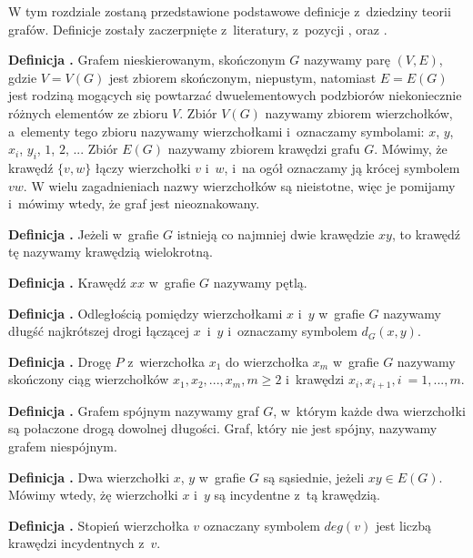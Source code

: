 W tym rozdziale zostaną przedstawione podstawowe definicje z~dziedziny teorii grafów.
Definicje zostały zaczerpnięte z~literatury, z~pozycji \cite{Wloch2008}, \cite{Wilson2012} oraz \cite{Wojciechwoski2013}.

\noindent
\textbf{Definicja .}
\incrementdefinitionIndex
Grafem nieskierowanym, skończonym $G$ nazywamy parę $(V,E)$, gdzie $V = V(G)$ jest zbiorem skończonym, niepustym,
natomiast $E = E(G)$ jest rodziną mogących się powtarzać dwuelementowych podzbiorów niekoniecznie różnych elementów ze zbioru $V$.
Zbiór $V(G)$ nazywamy zbiorem wierzchołków, a~elementy tego zbioru nazywamy wierzchołkami i~oznaczamy symbolami:
$x$, $y$, $x_i$, $y_i$, $1$, $2$, ... Zbiór $E(G)$ nazywamy zbiorem krawędzi grafu $G$.
Mówimy, że krawędź $\{v, w\}$ łączy wierzchołki $v$ i~$w$, i~na ogół oznaczamy ją krócej symbolem $vw$.
W wielu zagadnieniach nazwy wierzchołków są nieistotne, więc je pomijamy i~mówimy wtedy, że graf jest nieoznakowany.

\noindent
\textbf{Definicja .}
\incrementdefinitionIndex
Jeżeli w~grafie $G$ istnieją co najmniej dwie krawędzie $xy$, to krawędź tę nazywamy krawędzią wielokrotną.

\noindent
\textbf{Definicja .}
\incrementdefinitionIndex
Krawędź $xx$ w~grafie $G$ nazywamy pętlą.

\noindent
\textbf{Definicja .}
\incrementdefinitionIndex
Odległością pomiędzy wierzchołkami $x$ i~$y$ w~grafie $G$ nazywamy długść najkrótszej drogi łączącej $x$~i~$y$
i~oznaczamy symbolem $d_G(x,y)$.

\noindent
\textbf{Definicja .}
\incrementdefinitionIndex
Drogę $P$ z~wierzchołka $x_1$ do wierzchołka $x_m$ w~grafie $G$ nazywamy skończony ciąg wierzchołków
$x_1, x_2, ..., x_m, m \geqslant 2$ i~krawędzi ${x_i, x_{i + 1}}, i~= 1, ..., m$.

\noindent
\textbf{Definicja .}
\incrementdefinitionIndex
Grafem spójnym nazywamy graf $G$, w~którym każde dwa wierzchołki są połaczone drogą dowolnej długości.
Graf, który nie jest spójny, nazywamy grafem niespójnym.

\noindent
\textbf{Definicja .}
\incrementdefinitionIndex
Dwa wierzchołki $x$, $y$ w~grafie $G$ są sąsiednie, jeżeli $xy \in E(G)$.
Mówimy wtedy, żę wierzchołki $x$ i~$y$ są incydentne z~tą krawędzią.

\noindent
\textbf{Definicja .}
\incrementdefinitionIndex
Stopień wierzchołka $v$ oznaczany symbolem $deg(v)$ jest liczbą krawędzi incydentnych z~$v$.

